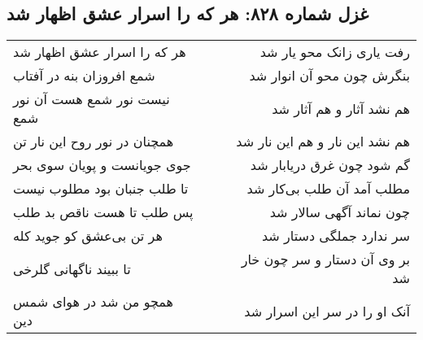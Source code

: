 \begin{center}
\section*{غزل شماره ۸۲۸: هر که را اسرار عشق اظهار شد}
\label{sec:0828}
\begin{longtable}{l p{0.5cm} r}
هر که را اسرار عشق اظهار شد
&&
رفت یاری زانک محو یار شد
\\
شمع افروزان بنه در آفتاب
&&
بنگرش چون محو آن انوار شد
\\
نیست نور شمع هست آن نور شمع
&&
هم نشد آثار و هم آثار شد
\\
همچنان در نور روح این نار تن
&&
هم نشد این نار و هم این نار شد
\\
جوی جویانست و پویان سوی بحر
&&
گم شود چون غرق دریابار شد
\\
تا طلب جنبان بود مطلوب نیست
&&
مطلب آمد آن طلب بی‌کار شد
\\
پس طلب تا هست ناقص بد طلب
&&
چون نماند آگهی سالار شد
\\
هر تن بی‌عشق کو جوید کله
&&
سر ندارد جملگی دستار شد
\\
تا ببیند ناگهانی گلرخی
&&
بر وی آن دستار و سر چون خار شد
\\
همچو من شد در هوای شمس دین
&&
آنک او را در سر این اسرار شد
\\
\end{longtable}
\end{center}

